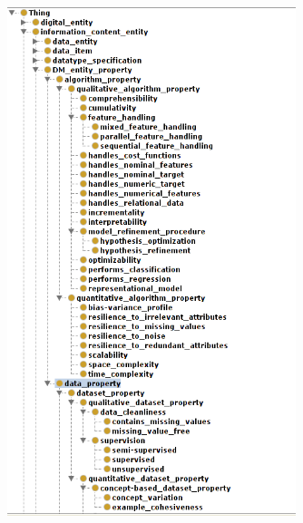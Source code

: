\documentclass[a4paper,12pt, english]{article}
\begin{document}
\begin{figure}[h]   
  \centering 
  \includegraphics[width=0.75\textwidth]{../figs/expose2-1}
  \caption{}
  \label{fig:expose2-1}
\end{figure}
\end{document}
